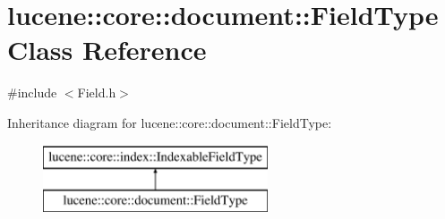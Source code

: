 \hypertarget{classlucene_1_1core_1_1document_1_1FieldType}{}\section{lucene\+:\+:core\+:\+:document\+:\+:Field\+Type Class Reference}
\label{classlucene_1_1core_1_1document_1_1FieldType}


{\ttfamily \#include $<$Field.\+h$>$}

Inheritance diagram for lucene\+:\+:core\+:\+:document\+:\+:Field\+Type\+:\begin{figure}[H]
\begin{center}
\leavevmode
\includegraphics[height=2.000000cm]{classlucene_1_1core_1_1document_1_1FieldType}
\end{center}
\end{figure}
